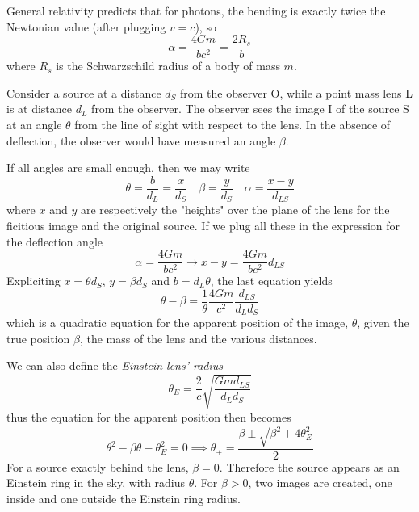 General relativity predicts that for photons, the bending is exactly twice the Newtonian value (after plugging $v=c$), so 
\begin{equation*}
    \alpha = \frac{4Gm}{bc^{2}} = \frac{2R_{s}}{b}
\end{equation*}
where $R_{s}$ is the Schwarzschild radius of a body of mass $m$.
\par Consider a source at a distance $d_{S}$ from the observer O, while a point mass lens L is at distance $d_{L}$ from the observer. The observer sees the image I of the source S at an angle $\theta$ from the line of sight with respect to the lens. In the absence of deflection, the observer would have measured an angle $\beta$.
\par If all angles are small enough, then we may write 
\begin{equation*}
    \theta = \frac{b}{d_{L}} = \frac{x}{d_{S}} \quad \beta = \frac{y}{d_{S}} \quad \alpha = \frac{x-y}{d_{LS}}
\end{equation*}
where $x$ and $y$ are respectively the "heights" over the plane of the lens for the ficitious image and the original source. If we plug all these in the expression for the deflection angle
\begin{equation}
    \alpha = \frac{4Gm}{bc^{2}} \to x-y = \frac{4Gm}{bc^{2}}d_{LS}
\end{equation}
Expliciting $x = \theta d_{S}$, $y = \beta d_{S}$ and $b = d_{L}\theta$, the last equation yields 
\begin{equation}
    \theta - \beta = \frac{1}{\theta}\frac{4Gm}{c^{2}}\frac{d_{LS}}{d_{L}d_{S}}
    \label{eq:deflectionangle}
\end{equation}
which is a quadratic equation for the apparent position of the image, $\theta$, given the true position $\beta$, the mass of the lens and the various distances.
\par We can also define the \emph{Einstein lens' radius}
\begin{equation}
    \theta_{E} = \frac{2}{c}\sqrt{\frac{Gmd_{LS}}{d_{L}d_{S}}}
    \label{eq:einsteinradius}
\end{equation}
thus the equation for the apparent position then becomes
\begin{equation*}
    \theta^{2}-\beta\theta -\theta_{E}^{2} = 0 \implies \theta_{\pm} = \frac{\beta \pm \sqrt{\beta^{2}+4\theta_{E}^{2}}}{2}
\end{equation*}
For a source exactly behind the lens, $\beta = 0$. Therefore the source appears as an Einstein ring in the sky, with radius $\theta$. For $\beta > 0$, two images are created, one inside and one outside the Einstein ring radius.
